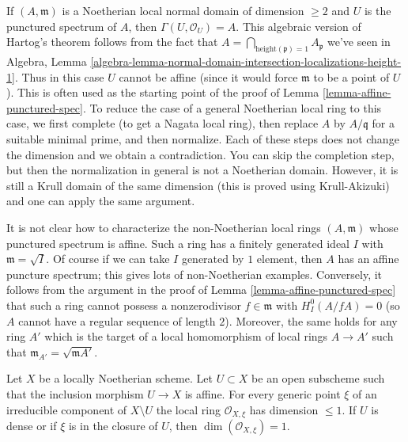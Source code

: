 \begin{remark}
\label{remark-affine-punctured-spectrum-standard-proof}
If $(A, \mathfrak m)$ is a Noetherian local normal domain of
dimension $\geq 2$ and $U$
is the punctured spectrum of $A$, then $\Gamma(U, \mathcal{O}_U) = A$.
This algebraic version of Hartog's theorem follows from the fact that
$A = \bigcap_{\text{height}(\mathfrak p) = 1} A_\mathfrak p$
we've seen in Algebra, Lemma
\ref{algebra-lemma-normal-domain-intersection-localizations-height-1}.
Thus in this case $U$ cannot be affine (since it would force $\mathfrak m$
to be a point of $U$). This is often used as the starting point of
the proof of Lemma \ref{lemma-affine-punctured-spec}.
To reduce the case of a general Noetherian local ring to this case,
we first complete (to get a Nagata local ring),
then replace $A$ by $A/\mathfrak q$ for a suitable minimal prime,
and then normalize. Each of these steps does not change the
dimension and we obtain a contradiction.
You can skip the completion step, but then the normalization in
general is not a Noetherian domain. However, it is still a
Krull domain of the same dimension (this is proved using
Krull-Akizuki) and one can apply the same argument.
\end{remark}

\begin{remark}
\label{remark-affine-puctured-spectrum-general}
It is not clear how to characterize the non-Noetherian local
rings $(A, \mathfrak m)$ whose punctured spectrum is affine.
Such a ring has a finitely generated ideal $I$ with
$\mathfrak m = \sqrt{I}$. Of course if we can take $I$
generated by $1$ element, then $A$ has an affine puncture
spectrum; this gives lots of non-Noetherian examples.
Conversely, it follows from the argument in the proof of
Lemma \ref{lemma-affine-punctured-spec}
that such a ring cannot possess a nonzerodivisor $f \in \mathfrak m$
with $H^0_I(A/fA) = 0$ (so $A$ cannot have a regular sequence
of length $2$). Moreover, the same holds for any ring $A'$ which is
the target of a local homomorphism of local rings $A \to A'$ such that
$\mathfrak m_{A'} = \sqrt{\mathfrak mA'}$.
\end{remark}

\begin{lemma}
\label{lemma-complement-affine-open-immersion}
\begin{reference}
\cite[EGA IV, Corollaire 21.12.7]{EGA4}
\end{reference}
Let $X$ be a locally Noetherian scheme. Let $U \subset X$ be an open subscheme
such that the inclusion morphism $U \to X$ is affine.
For every generic point $\xi$ of an irreducible component of
$X \setminus U$ the local ring $\mathcal{O}_{X, \xi}$
has dimension $\leq 1$. If $U$ is dense or if $\xi$ is in the closure
of $U$, then $\dim(\mathcal{O}_{X, \xi}) = 1$.
\end{lemma}

